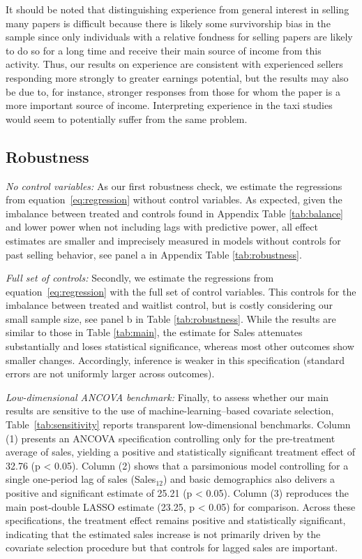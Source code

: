 \documentclass[12pt]{article}
\begin{document}
It should be noted that distinguishing experience from general interest in selling many papers is difficult because there is likely some survivorship bias in the sample since only individuals with a relative fondness for selling papers are likely to do so for a long time and receive their main source of income from this activity. Thus, our results on experience are consistent with experienced sellers responding more strongly to greater earnings potential, but the results may also be due to, for instance, stronger responses from those for whom the paper is a more important source of income. Interpreting experience in the taxi studies would seem to potentially suffer from the same problem. 

\subsection{Robustness}
\textit{No control variables:} As our first robustness check, we estimate the regressions from equation~\eqref{eq:regression} without control variables. As expected, given the imbalance between treated and controls found in Appendix Table \ref{tab:balance} and lower power when not including lags with predictive power, all effect estimates are smaller and imprecisely measured in models without controls for past selling behavior, see panel a in Appendix Table \ref{tab:robustness}.

\textit{Full set of controls:} Secondly, we estimate the regressions from equation~\eqref{eq:regression} with the full set of control variables. This controls for the imbalance between treated and waitlist control, but is costly considering our small sample size, see panel b in Table \ref{tab:robustness}. While the results are similar to those in Table \ref{tab:main}, the estimate for Sales attenuates substantially and loses statistical significance, whereas most other outcomes show smaller changes. Accordingly, inference is weaker in this specification (standard errors are not uniformly larger across outcomes).

\textit{Low-dimensional ANCOVA benchmark:} Finally, to assess whether our main results are sensitive to the use of machine-learning–based covariate selection, Table~\ref{tab:sensitivity} reports transparent low-dimensional benchmarks. Column (1) presents an ANCOVA specification controlling only for the pre-treatment average of sales, yielding a positive and statistically significant treatment effect of 32.76 (p < 0.05). Column (2) shows that a parsimonious model controlling for a single one-period lag of sales (Sales$_{12}$) and basic demographics also delivers a positive and significant estimate of 25.21 (p < 0.05). Column (3) reproduces the main post-double LASSO estimate (23.25, p < 0.05) for comparison. Across these specifications, the treatment effect remains positive and statistically significant, indicating that the estimated sales increase is not primarily driven by the covariate selection procedure but that controls for lagged sales are important.
\end{document}
